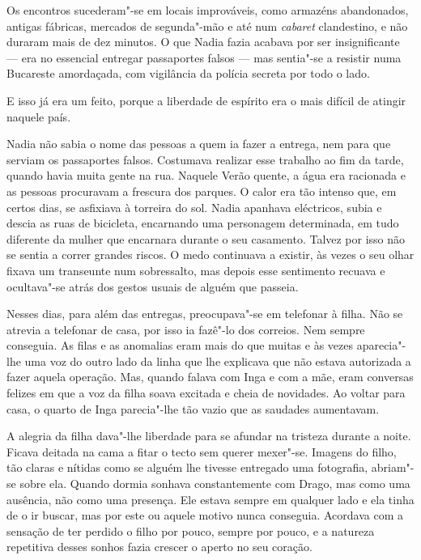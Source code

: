 Os encontros sucederam"-se em locais improváveis,
como armazéns abandonados, antigas fábricas, mercados de segunda"-mão e
até num \emph{cabaret} clandestino, e não duraram mais de dez minutos. O
que Nadia fazia acabava por ser insignificante --- era no essencial
entregar passaportes falsos --- mas sentia"-se a resistir numa Bucareste
amordaçada, com vigilância da polícia secreta por todo o lado.

E isso já era um feito, porque a liberdade de espírito era o mais
difícil de atingir naquele país.

Nadia não sabia o nome das pessoas a quem ia fazer a entrega, nem para
que serviam os passaportes falsos. Costumava realizar esse trabalho ao
fim da tarde, quando havia muita gente na rua. Naquele Verão quente, a
água era racionada e as pessoas procuravam a frescura dos parques. O
calor era tão intenso que, em certos dias, se asfixiava à torreira do
sol. Nadia apanhava eléctricos, subia e descia as ruas de bicicleta,
encarnando uma personagem determinada, em tudo diferente da mulher que
encarnara durante o seu casamento. Talvez por isso não se sentia a
correr grandes riscos. O medo continuava a existir, às vezes o seu olhar
fixava um transeunte num sobressalto, mas depois esse sentimento recuava
e ocultava"-se atrás dos gestos usuais de alguém que passeia.

Nesses dias, para além das entregas, preocupava"-se em
telefonar à filha. Não se atrevia a telefonar de casa, por isso ia
fazê"-lo dos correios. Nem sempre conseguia. As filas e as anomalias eram
mais do que muitas e às vezes aparecia"-lhe uma voz do outro lado da
linha que lhe explicava que não estava autorizada a fazer aquela
operação. Mas, quando falava com Inga e com a mãe, eram conversas
felizes em que a voz da filha soava excitada e cheia de novidades. Ao
voltar para casa, o quarto de Inga parecia"-lhe tão vazio que as saudades aumentavam.

A alegria da filha dava"-lhe liberdade para se afundar na tristeza
durante a noite. Ficava deitada na cama a fitar o tecto sem querer
mexer"-se. Imagens do filho, tão claras e nítidas como se alguém lhe
tivesse entregado uma fotografia, abriam"-se sobre ela. Quando dormia sonhava constantemente com
Drago, mas como uma ausência, não como uma presença. Ele estava sempre
em qualquer lado e ela tinha de o ir buscar, mas por este ou aquele
motivo nunca conseguia. Acordava com a sensação de ter perdido o filho
por pouco, sempre por pouco, e a natureza repetitiva desses sonhos
fazia crescer o aperto no seu coração.

